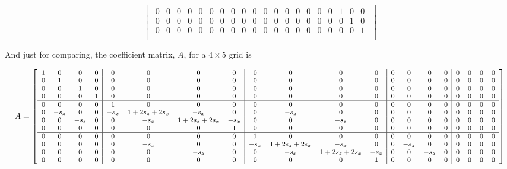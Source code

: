 \begin{landscape}
\begin{equation}
{\begin{bmatrix}
\begin{array}{ccccc|ccccc|ccccc|ccccc}
       0 & 0 & 0 & 0 & 0 & 0 & 0 & 0 & 0 & 0 & 0 & 0 & 0 & 0 & 0 & 0 & 0 & 1 & 0 & 0 \\ %
       0 & 0 & 0 & 0 & 0 & 0 & 0 & 0 & 0 & 0 & 0 & 0 & 0 & 0 & 0 & 0 & 0 & 0 & 1 & 0 \\ %
       0 & 0 & 0 & 0 & 0 & 0 & 0 & 0 & 0 & 0 & 0 & 0 & 0 & 0 & 0 & 0 & 0 & 0 & 0 & 1 \\ %
   \end{array}
    \end{bmatrix}
\label{eq:2D45A}
}
\end{equation}
\begin{flushleft}
 	And just for comparing, the coefficient matrix, $A$, for a $4 \times 5$ grid is
\end{flushleft}
\begin{equation}
\setcounter{MaxMatrixCols}{20}
\footnotesize{
A = \begin{bmatrix}
    \begin{array}{cccc|cccc|cccc|cccc|cccc}
       1 & 0 & 0 & 0 & 0 & 0 & 0 & 0 & 0 & 0 & 0 & 0 & 0 & 0 & 0 & 0 & 0 & 0 & 0 & 0 \\ %
       0 & 1 & 0 & 0 & 0 & 0 & 0 & 0 & 0 & 0 & 0 & 0 & 0 & 0 & 0 & 0 & 0 & 0 & 0 & 0 \\ %
       0 & 0 & 1 & 0 & 0 & 0 & 0 & 0 & 0 & 0 & 0 & 0 & 0 & 0 & 0 & 0 & 0 & 0 & 0 & 0 \\ %
       0 & 0 & 0 & 1 & 0 & 0 & 0 & 0 & 0 & 0 & 0 & 0 & 0 & 0 & 0 & 0 & 0 & 0 & 0 & 0 \\ %
         \hline
       0 & 0 & 0 & 0 & 1 & 0 & 0 & 0 & 0 & 0 & 0 & 0 & 0 & 0 & 0 & 0 & 0 & 0 & 0 & 0 \\ %
       0 & -s_z & 0 & 0 & -s_x & 1+2s_z+2s_x & -s_x & 0 & 0 & -s_z & 0 & 0 & 0 & 0 & 0 & 0 & 0 & 0 & 0 & 0 \\ %
       0 & 0 & -s_z & 0 & 0 & -s_x & 1+2s_z+2s_x & -s_x & 0 & 0 & -s_z & 0 & 0 & 0 & 0 & 0 & 0 & 0 & 0 & 0 \\ %
       0 & 0 & 0 & 0 & 0 & 0 & 0 & 1 & 0 & 0 & 0 & 0 & 0 & 0 & 0 & 0 & 0 & 0 & 0 & 0 \\ %
       \hline
       0 & 0 & 0 & 0 & 0 & 0 & 0 & 0 & 1 & 0 & 0 & 0 & 0 & 0 & 0 & 0 & 0 & 0 & 0 & 0 \\ %
       0 & 0 & 0 & 0 & 0 & -s_z & 0 & 0 & -s_x & 1+2s_z+2s_x & -s_x & 0 & 0 & -s_z & 0 & 0 & 0 & 0 & 0 & 0 \\ %
       0 & 0 & 0 & 0 & 0 & 0 & -s_z & 0 & 0 & -s_x & 1+2s_z+2s_x & -s_x & 0 & 0 & -s_z & 0 & 0 & 0 & 0 & 0 \\ %
       0 & 0 & 0 & 0 & 0 & 0 & 0 & 0 & 0 & 0 & 0 & 1 & 0 & 0 & 0 & 0 & 0 & 0 & 0 & 0 \\ %

\end{array}
\end{bmatrix}}
\end{equation}
\end{landscape}
